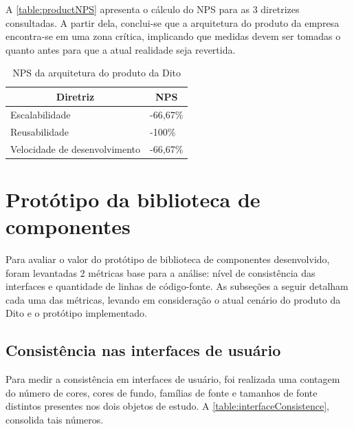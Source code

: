 A \autoref{table:productNPS} apresenta o cálculo do NPS para as 3 diretrizes consultadas. A partir dela, conclui-se que a arquitetura do produto da empresa encontra-se em uma zona crítica, implicando que medidas devem ser tomadas o quanto antes para que a atual realidade seja revertida.

\begin{table}
  \centering
  \begin{tabular}{|m{6cm}|m{2cm}|} \hline
    
    \multicolumn{1}{|c|}{\bfseries Diretriz} & \multicolumn{1}{c|}{\bfseries NPS} \\\hline
    
    Escalabilidade & -66,67\% \\\hline
    Reusabilidade & -100\% \\\hline
    Velocidade de desenvolvimento & -66,67\% \\\hline
      
  \end{tabular}
  \caption{NPS da arquitetura do produto da Dito}
  \label{table:productNPS}
\end{table}


\section{Protótipo da biblioteca de componentes}

Para avaliar o valor do protótipo de biblioteca de componentes desenvolvido, foram levantadas 2 métricas base para a análise: nível de consistência das interfaces e quantidade de linhas de código-fonte. As subseções a seguir detalham cada uma das métricas, levando em consideração o atual cenário do produto da Dito e o protótipo implementado.

\subsection{Consistência nas interfaces de usuário}

Para medir a consistência em interfaces de usuário, foi realizada uma contagem do número de cores, cores de fundo, famílias de fonte e tamanhos de fonte distintos presentes nos dois objetos de estudo. A \autoref{table:interfaceConsistence}, consolida tais números.

